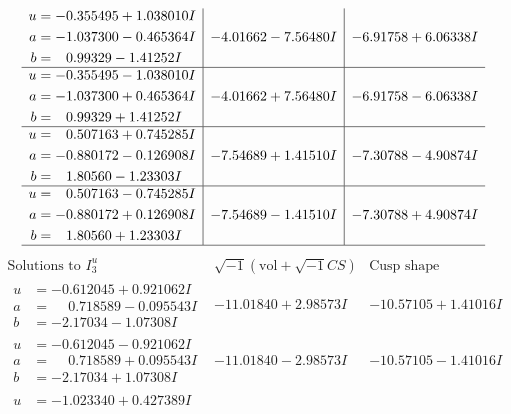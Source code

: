 \documentclass[1p]{elsarticle_modified}
\theoremstyle{definition}
\newcommand{\I}{\sqrt{-1}}
\begin{document}
$$\begin{array}{c|c|c}
\begin{aligned}
u &= -0.355495 + 1.038010 I \\
a &= -1.037300 - 0.465364 I \\
b &= \phantom{-}0.99329 - 1.41252 I\end{aligned}
 & -4.01662 - 7.56480 I & -6.91758 + 6.06338 I \\ \hline\begin{aligned}
u &= -0.355495 - 1.038010 I \\
a &= -1.037300 + 0.465364 I \\
b &= \phantom{-}0.99329 + 1.41252 I\end{aligned}
 & -4.01662 + 7.56480 I & -6.91758 - 6.06338 I \\ \hline\begin{aligned}
u &= \phantom{-}0.507163 + 0.745285 I \\
a &= -0.880172 - 0.126908 I \\
b &= \phantom{-}1.80560 - 1.23303 I\end{aligned}
 & -7.54689 + 1.41510 I & -7.30788 - 4.90874 I \\ \hline\begin{aligned}
u &= \phantom{-}0.507163 - 0.745285 I \\
a &= -0.880172 + 0.126908 I \\
b &= \phantom{-}1.80560 + 1.23303 I\end{aligned}
 & -7.54689 - 1.41510 I & -7.30788 + 4.90874 I\\
 \hline 
 \end{array}$$\newpage$$\begin{array}{c|c|c}  
\text{Solutions to }I^u_{3}& \I (\text{vol} + \sqrt{-1}CS) & \text{Cusp shape}\\
 \hline 
\begin{aligned}
u &= -0.612045 + 0.921062 I \\
a &= \phantom{-}0.718589 - 0.095543 I \\
b &= -2.17034 - 1.07308 I\end{aligned}
 & -11.01840 + 2.98573 I & -10.57105 + 1.41016 I \\ \hline\begin{aligned}
u &= -0.612045 - 0.921062 I \\
a &= \phantom{-}0.718589 + 0.095543 I \\
b &= -2.17034 + 1.07308 I\end{aligned}
 & -11.01840 - 2.98573 I & -10.57105 - 1.41016 I \\ \hline\begin{aligned}
u &= -1.023340 + 0.427389 I \\

\end{aligned}
\end{array}$$
\end{document}
